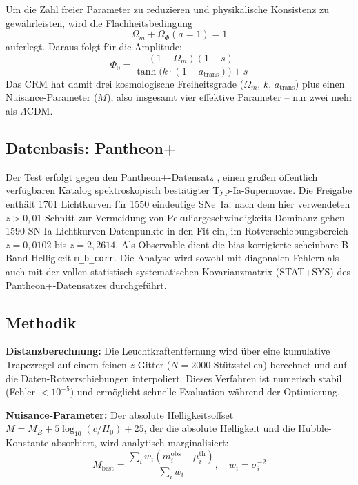 \documentclass[aps,prd,twocolumn,superscriptaddress,nofootinbib]{revtex4-2}
\begin{document}
Um die Zahl freier Parameter zu reduzieren und physikalische Konsistenz zu gewährleisten, wird die Flachheitsbedingung
\begin{equation}
\Omega_m + \Omega_\Phi(a{=}1) = 1
\label{eq:flatness}
\end{equation}
auferlegt. Daraus folgt für die Amplitude:
\begin{equation}
\Phi_0 = \frac{(1 - \Omega_m)(1 + s)}{\tanh\!\big(k\cdot(1 - a_{\mathrm{trans}})\big) + s}
\end{equation}
Das CRM hat damit drei kosmologische Freiheitsgrade ($\Omega_m$, $k$, $a_{\mathrm{trans}}$) plus einen Nuisance-Parameter ($M$), also insgesamt vier effektive Parameter -- nur zwei mehr als $\Lambda$CDM.

\subsection{Datenbasis: Pantheon+}
\label{subsec:pantheonplus}

Der Test erfolgt gegen den Pantheon+-Datensatz \cite{Scolnic2022}, einen großen öffentlich verfügbaren Katalog spektroskopisch bestätigter Typ-Ia-Supernovae. Die Freigabe enthält 1701 Lichtkurven für 1550 eindeutige SNe~Ia; nach dem hier verwendeten $z > 0{,}01$-Schnitt zur Vermeidung von Pekuliargeschwindigkeits-Dominanz gehen 1590 SN-Ia-Lichtkurven-Datenpunkte in den Fit ein, im Rotverschiebungsbereich $z = 0{,}0102$ bis $z = 2{,}2614$. Als Observable dient die bias-korrigierte scheinbare B-Band-Helligkeit \texttt{m\_b\_corr}. Die Analyse wird sowohl mit diagonalen Fehlern als auch mit der vollen statistisch-systematischen Kovarianzmatrix (STAT+SYS) des Pantheon+-Datensatzes durchgeführt.

\subsection{Methodik}
\label{subsec:methodology}

\textbf{Distanzberechnung:} Die Leuchtkraftentfernung wird über eine kumulative Trapezregel auf einem feinen $z$-Gitter ($N = 2000$ Stützstellen) berechnet und auf die Daten-Rotverschiebungen interpoliert. Dieses Verfahren ist numerisch stabil (Fehler $< 10^{-5}$) und ermöglicht schnelle Evaluation während der Optimierung.

\textbf{Nuisance-Parameter:} Der absolute Helligkeitsoffset $M = M_B + 5\log_{10}(c/H_0) + 25$, der die absolute Helligkeit und die Hubble-Konstante absorbiert, wird analytisch marginalisiert:
\begin{equation}
M_{\mathrm{best}} = \frac{\sum_i w_i (m_i^{\mathrm{obs}} - \mu_i^{\mathrm{th}})}{\sum_i w_i}, \quad w_i = \sigma_i^{-2}
\end{equation}
\end{document}
